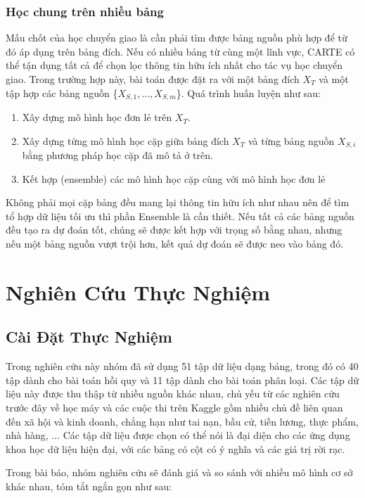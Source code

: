 \documentclass{article}
\begin{document}
\subsubsection{Học chung trên nhiều bảng}
Mấu chốt của học chuyển giao là cần phải tìm được bảng nguồn phù hợp để từ đó áp dụng trên bảng đích. Nếu có nhiều bảng từ cùng một lĩnh vực, CARTE có thể tận dụng tất cả để chọn lọc thông tin hữu ích nhất cho tác vụ học chuyển giao. Trong trường hợp này, bài toán được đặt ra với một bảng đích $X_T$ và một tập hợp các bảng nguồn \{$X_{S,1}, ..., X_{S,m}$\}. Quá trình huấn luyện như sau:
\begin{enumerate}
    \item Xây dựng mô hình học đơn lẻ trên $X_T$.
    \item Xây dựng từng mô hình học cặp giữa bảng đích $X_T$ và từng bảng nguồn $X_{S,i}$ bằng phương pháp học cặp đã mô tả ở trên.
    \item Kết hợp (ensemble) các mô hình học cặp cùng với mô hình học đơn lẻ
\end{enumerate}

Không phải mọi cặp bảng đều mang lại thông tin hữu ích như nhau nên để tìm tổ hợp dữ liệu tối ưu thì phần Ensemble là cần thiết. Nếu tất cả các bảng nguồn đều tạo ra dự đoán tốt, chúng sẽ được kết hợp với trọng số bằng nhau, nhưng nếu một bảng nguồn vượt trội hơn, kết quả dự đoán sẽ được neo vào bảng đó.

\section{Nghiên Cứu Thực Nghiệm}
\subsection{Cài Đặt Thực Nghiệm}
Trong nghiên cứu này nhóm đã sử dụng 51 tập dữ liệu dạng bảng, trong đó có 40 tập dành cho bài toán hồi quy và 11 tập dành cho bài toán phân loại. Các tập dữ liệu này được thu thập từ nhiều nguồn khác nhau, chủ yếu từ các nghiên cứu trước đây về học máy và các cuộc thi trên Kaggle gồm nhiều chủ đề liên quan đến xã hội và kinh doanh, chẳng hạn như tai nạn, bầu cử, tiền lương, thực phẩm, nhà hàng, ... Các tập dữ liệu được chọn có thể nói là đại diện cho các ứng dụng khoa học dữ liệu hiện đại, với các bảng có cột có ý nghĩa và các giá trị rời rạc.

Trong bài báo, nhóm nghiên cứu sẽ đánh giá và so sánh với nhiều mô hình cơ sở khác nhau, tóm tắt ngắn gọn như sau: 
\end{document}
